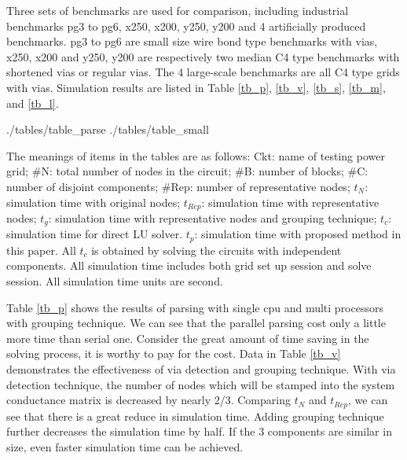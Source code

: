 \documentclass{sig-alternate}
\begin{document}
	Three sets of benchmarks are used for comparison, including 
	industrial benchmarks pg3 to pg6, x250, x200, y250, y200 and 4 artificially produced benchmarks. pg3 to pg6 are 
	small size wire bond type benchmarks with vias, x250, x200 and y250, y200 are respectively two median C4 type benchmarks with
	shortened vias or regular vias. The 4 large-scale benchmarks are all C4 type grids with vias. Simulation results are 
	listed in Table \ref{tb_p}, \ref{tb_v}, \ref{tb_s}, \ref{tb_m}, and \ref{tb_l}.
	\begin{table}[h]
	   {./tables/table_parse} \label{tb_p}
	   \label{tb_v}
  	   {./tables/table_small} \label{tb_s}
	\end{table}
	\begin{table}[h]
  	   \label{tb_m}
  	   \label{tb_l}
	\end{table}

	The meanings of items in the tables are as follows: Ckt: name of testing power grid; \#N: total number of nodes in the circuit; 
	\#B: number of blocks; \#C: number of disjoint components; \#Rep: number of representative nodes; 
  	$t_N$: simulation time with original nodes; $t_{Rep}$: simulation time with representative nodes; 
	$t_g$: simulation time with representative nodes and grouping technique; $t_c$: simulation time for direct LU solver. 
	$t_p$: simulation time with proposed method in this paper.  
	All $t_c$ is obtained by solving the circuits with independent components. All 
	simulation time includes both grid set up session and solve session. All simulation time units are second.

	Table \ref{tb_p} shows the results of parsing with single cpu and multi processors with grouping technique. We can see that the
	parallel parsing cost only a little more time than serial one. Consider the great amount of time saving in the solving process,
	it is worthy to pay for the cost. 
	Data in Table \ref{tb_v} demonstrates the effectiveness of via detection and grouping technique. With via detection 
	technique, the 
	number of nodes which will be stamped into the system conductance matrix is decreased by nearly 2/3. Comparing $t_N$ 
	and $t_{Rep}$, we can see that there is a
	great reduce in simulation time. Adding grouping technique further decreases the simulation time by half. If the 3 components are 
	similar in size, even faster simulation time can be achieved.
\end{document}
